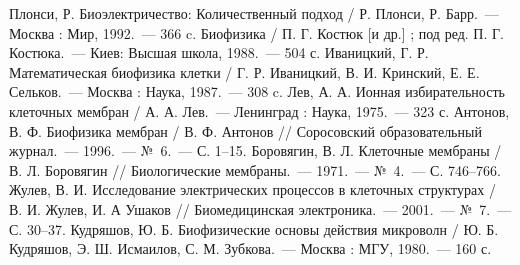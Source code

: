 \begin{thebibliography}{99}
 Плонси, Р. Биоэлектричество: Количественный подход / Р. Плонси,
    Р. Барр.~--- Москва : Мир, 1992.~--- 366 c.
 Биофизика / П. Г. Костюк [и др.] ; под ред. П. Г. Костюка.~--- Киев: Высшая
    школа, 1988.~--- 504 с.
 Иваницкий, Г. Р. Математическая биофизика клетки / Г. Р.
    Иваницкий, В. И. Кринский, Е. Е. Сельков.~--- Москва : Наука, 1987.~---
    308 c.
 Лев, А. А. Ионная избирательность клеточных мембран /
    А. А. Лев.~--- Ленинград : Наука, 1975.~--- 323 с.
 Антонов, В. Ф. Биофизика мембран / В. Ф. Антонов // Соросовский
    образовательный журнал.~--- 1996.~--- №~6.~--- С. 1--15.
 Боровягин, В. Л. Клеточные мембраны / В. Л. Боровягин //
    Биологические мембраны.~--- 1971.~--- №~4.~--- С. 746--766.
 Жулев, В. И. Исследование электрических процессов в клеточных
    структурах / В. И. Жулев, И. А Ушаков // Биомедицинская электроника.~---
    2001.~--- №~7.~--- С. 30--37.
 Кудряшов, Ю. Б. Биофизические основы действия микроволн /
    Ю. Б. Кудряшов, Э. Ш. Исмаилов, С. М. Зубкова.~--- Москва : МГУ, 1980.~---
    160 с.
\end{thebibliography}
